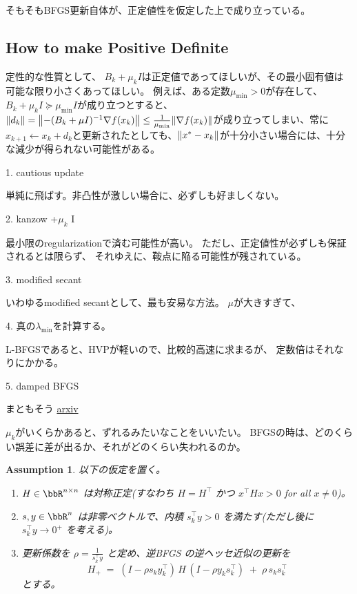 \documentclass[a4paper, 10pt, dvipdfmx,draft]{article}
\newtheorem{assumption}{Assumption}
\begin{document}
そもそもBFGS更新自体が、正定値性を仮定した上で成り立っている。

\subsection{How to make Positive Definite}

定性的な性質として、
$B_k + \mu_k I$は正定値であってほしいが、その最小固有値は可能な限り小さくあってほしい。
例えば、ある定数$\mu_{\min}>0$が存在して、
$B_k + \mu_k I \succeq \mu_{\min} I$が成り立つとすると、
$\norm{d_k} = \norm{-(B_k + \mu I)^{-1} \nabla f(x_k)} \leq \frac{1}{\mu_{\min}} \norm{\nabla f(x_k)}$が成り立ってしまい、常に$x_{k+1}\gets x_k + d_k$と更新されたとしても、$\norm{x^* - x_k}$が十分小さい場合には、十分な減少が得られない可能性がある。

1. cautious update

単純に飛ばす。非凸性が激しい場合に、必ずしも好ましくない。

2. kanzow +$\mu_k$ I

最小限のregularizationで済む可能性が高い。
ただし、正定値性が必ずしも保証されるとは限らず、
それゆえに、鞍点に陥る可能性が残されている。

3. modified secant

いわゆるmodified secantとして、最も安易な方法。
$\mu$が大きすぎて、

4. 真の$\lambda_{\min}$を計算する。

L-BFGSであると、HVPが軽いので、比較的高速に求まるが、
定数倍はそれなりにかかる。

5. damped BFGS

まともそう
\href{https://arxiv.org/pdf/2012.05783}{arxiv}


$\mu_k$がいくらかあると、ずれるみたいなことをいいたい。
BFGSの時は、どのくらい誤差に差が出るか、それがどのくらい失われるのか。


\begin{assumption}
    以下の仮定を置く。
    \begin{enumerate}
        \item \(H\in\bbR^{n\times n}\) は対称正定(すなわち \(H=H^\top\) かつ \(x^\top H x>0\) for all \(x\neq0\))。
        \item \(s,y\in\bbR^n\) は非零ベクトルで、内積 \(s_k^\top y>0\) を満たす(ただし後に \(s_k^\top y\to0^+\) を考える)。
        \item 更新係数を \(\displaystyle \rho=\frac{1}{s_k^\top y}\) と定め、逆BFGS の逆ヘッセ近似の更新を
              \[
                  H_{+} \;=\; (I-\rho s_k y_k^\top)\,H\,(I-\rho y_k s_k^\top) \;+\; \rho\, s_k s_k^\top
              \]
              とする。
    \end{enumerate}
\end{assumption}
\end{document}

